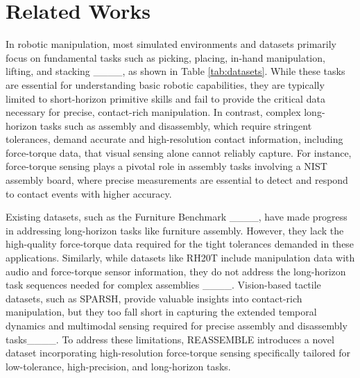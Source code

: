 \section{Related Works}
In robotic manipulation, most simulated environments and datasets primarily focus on fundamental tasks such as picking, placing, in-hand manipulation, lifting, and stacking ____, as shown in Table \ref{tab:datasets}. While these tasks are essential for understanding basic robotic capabilities, they are typically limited to short-horizon primitive skills and fail to provide the critical data necessary for precise, contact-rich manipulation. In contrast, complex long-horizon tasks such as assembly and disassembly, which require stringent tolerances, demand accurate and high-resolution contact information, including force-torque data, that visual sensing alone cannot reliably capture. For instance, force-torque sensing plays a pivotal role in assembly tasks involving a NIST assembly board, where precise measurements are essential to detect and respond to contact events with higher accuracy.

Existing datasets, such as the Furniture Benchmark ____, have made progress in addressing long-horizon tasks like furniture assembly. However, they lack the high-quality force-torque data required for the tight tolerances demanded in these applications. Similarly, while datasets like RH20T include manipulation data with audio and force-torque sensor information, they do not address the long-horizon task sequences needed for complex assemblies ____. Vision-based tactile datasets, such as SPARSH, provide valuable insights into contact-rich manipulation, but they too fall short in capturing the extended temporal dynamics and multimodal sensing required for precise assembly and disassembly tasks____. To address these limitations, REASSEMBLE introduces a novel dataset incorporating high-resolution force-torque sensing specifically tailored for low-tolerance, high-precision, and long-horizon tasks.

